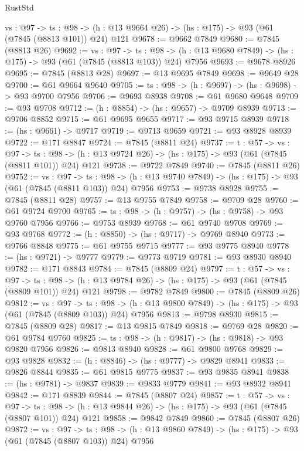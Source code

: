 \begin{lexlean}{RustStd}
\begin{coremodule}
  {vs : @97} ->
  {ts : @98} -> (h : @13 @9664 @26) -> (hs : @175) -> @93 (@61 (@7845 (@8813 @101)) @24) @121
@9678 := @9662 @7849
@9680 := @7845 (@8813 @26)
@9692 := {vs : @97} ->
  {ts : @98} -> (h : @13 @9680 @7849) -> (hs : @175) -> @93 (@61 (@7845 (@8813 @103)) @24) @7956
@9693 := @9678 @8926
@9695 := @7845 (@8813 @28)
@9697 := @13 @9695 @7849
@9698 := @9649 @28
@9700 := @61 @9664 @9640
@9705 := {ts : @98} -> (h : @9697) -> (hs : @9698) -> @93 @9700 @7956
@9706 := @9693 @8938
@9708 := @61 @9680 @9648
@9709 := @93 @9708
@9712 := (h : @8854) -> (hs : @9657) -> @9709 @8939
@9713 := @9706 @8852
@9715 := @61 @9695 @9655
@9717 := @93 @9715 @8939
@9718 := (hs : @9661) -> @9717
@9719 := @9713 @9659
@9721 := @93 @8928 @8939
@9722 := @171 @8847
@9724 := @7845 (@8811 @24)
@9737 := {t : @57} ->
  {vs : @97} ->
  {ts : @98} -> (h : @13 @9724 @26) -> (hs : @175) -> @93 (@61 (@7845 (@8811 @101)) @24) @121
@9738 := @9722 @7849
@9740 := @7845 (@8811 @26)
@9752 := {vs : @97} ->
  {ts : @98} -> (h : @13 @9740 @7849) -> (hs : @175) -> @93 (@61 (@7845 (@8811 @103)) @24) @7956
@9753 := @9738 @8928
@9755 := @7845 (@8811 @28)
@9757 := @13 @9755 @7849
@9758 := @9709 @28
@9760 := @61 @9724 @9700
@9765 := {ts : @98} -> (h : @9757) -> (hs : @9758) -> @93 @9760 @7956
@9766 := @9753 @8939
@9768 := @61 @9740 @9708
@9769 := @93 @9768
@9772 := (h : @8850) -> (hs : @9717) -> @9769 @8940
@9773 := @9766 @8848
@9775 := @61 @9755 @9715
@9777 := @93 @9775 @8940
@9778 := (hs : @9721) -> @9777
@9779 := @9773 @9719
@9781 := @93 @8930 @8940
@9782 := @171 @8843
@9784 := @7845 (@8809 @24)
@9797 := {t : @57} ->
  {vs : @97} ->
  {ts : @98} -> (h : @13 @9784 @26) -> (hs : @175) -> @93 (@61 (@7845 (@8809 @101)) @24) @121
@9798 := @9782 @7849
@9800 := @7845 (@8809 @26)
@9812 := {vs : @97} ->
  {ts : @98} -> (h : @13 @9800 @7849) -> (hs : @175) -> @93 (@61 (@7845 (@8809 @103)) @24) @7956
@9813 := @9798 @8930
@9815 := @7845 (@8809 @28)
@9817 := @13 @9815 @7849
@9818 := @9769 @28
@9820 := @61 @9784 @9760
@9825 := {ts : @98} -> (h : @9817) -> (hs : @9818) -> @93 @9820 @7956
@9826 := @9813 @8940
@9828 := @61 @9800 @9768
@9829 := @93 @9828
@9832 := (h : @8846) -> (hs : @9777) -> @9829 @8941
@9833 := @9826 @8844
@9835 := @61 @9815 @9775
@9837 := @93 @9835 @8941
@9838 := (hs : @9781) -> @9837
@9839 := @9833 @9779
@9841 := @93 @8932 @8941
@9842 := @171 @8839
@9844 := @7845 (@8807 @24)
@9857 := {t : @57} ->
  {vs : @97} ->
  {ts : @98} -> (h : @13 @9844 @26) -> (hs : @175) -> @93 (@61 (@7845 (@8807 @101)) @24) @121
@9858 := @9842 @7849
@9860 := @7845 (@8807 @26)
@9872 := {vs : @97} ->
  {ts : @98} -> (h : @13 @9860 @7849) -> (hs : @175) -> @93 (@61 (@7845 (@8807 @103)) @24) @7956

\end{coremodule}
\end{lexlean}
